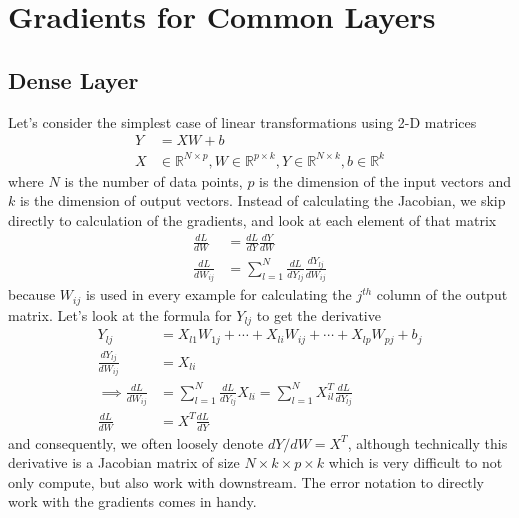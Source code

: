 \documentclass[../../deep_learning_notes.tex]{subfiles}
\begin{document}
\section{Gradients for Common Layers}
\subsection{Dense Layer}
Let's consider the simplest case of linear transformations using 2-D matrices
\begin{align*}
    Y &= XW + b\\
    X &\in \mathbb{R}^{N \times p}, W \in \mathbb{R}^{p \times k}, Y \in \mathbb{R}^{N \times k}, b \in \mathbb{R}^{k}
\end{align*}
where $N$ is the number of data points, $p$ is the dimension of the input vectors and $k$ is the dimension of output vectors. Instead of calculating the Jacobian, we skip directly to calculation of the gradients, and look at each element of that matrix
\begin{align*}
    \frac{dL}{dW} &= \frac{dL}{dY} \frac{dY}{dW}\\
    \frac{dL}{dW_{ij}} &= \sum_{l=1}^{N} \frac{dL}{dY_{lj}} \frac{dY_{lj}}{dW_{ij}}
\end{align*}
because $W_{ij}$ is used in every example for calculating the $j^{th}$ column of the output matrix. Let's look at the formula for $Y_{lj}$ to get the derivative
\begin{align*}
    Y_{lj} &= X_{l1}W_{1j} + \cdots + X_{li}W_{ij} + \cdots + X_{lp}W_{pj} + b_{j}\\
    \frac{dY_{lj}}{dW_{ij}} &= X_{li}\\
    \implies \frac{dL}{dW_{ij}} &= \sum_{l=1}^{N} \frac{dL}{dY_{lj}} X_{li} = \sum_{l=1}^{N} X^{T}_{il}\frac{dL}{dY_{lj}}\\
    \frac{dL}{dW} &= X^{T} \frac{dL}{dY}
\end{align*}
and consequently, we often loosely denote $dY/dW = X^{T}$, although technically this derivative is a Jacobian matrix of size $N \times k \times p \times k$ which is very difficult to not only compute, but also work with downstream. The error notation to directly work with the gradients comes in handy.\newline
\end{document}
